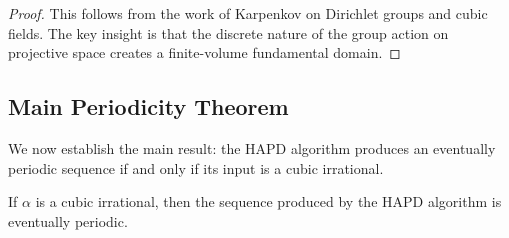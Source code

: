 \begin{proof}
This follows from the work of Karpenkov \cite{Karpenkov2022} on Dirichlet groups and cubic fields. The key insight is that the discrete nature of the group action on projective space creates a finite-volume fundamental domain.
\end{proof}

\subsection{Main Periodicity Theorem}

We now establish the main result: the HAPD algorithm produces an eventually periodic sequence if and only if its input is a cubic irrational.

\begin{theorem}\label{thm:cubic_periodic}
If $\alpha$ is a cubic irrational, then the sequence produced by the HAPD algorithm is eventually periodic.
\end{theorem}

